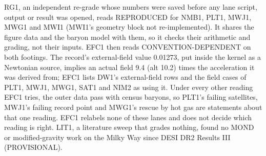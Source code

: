 \documentclass[10pt]{article}
\begin{document}
\begin{itemize}
RG1, an independent re-grade whose numbers were saved before any lane script, output or result was opened, reads REPRODUCED for NMB1, PLT1, MWJ1, MWG1 and MWI1 (MWI1's geometry block not re-implemented). It shares the figure data and the baryon model with them, so it checks their arithmetic and grading, not their inputs. EFC1 then reads CONVENTION-DEPENDENT on both footings. The record's external-field value 0.01273, put inside the kernel as a Newtonian source, implies an actual field 9.4 (alt 10.2) times the acceleration it was derived from; EFC1 lists DW1's external-field rows and the field cases of PLT1, MWJ1, MWG1, SAT1 and NIM2 as using it. Under every other reading EFC1 tries, the outer data pass with census baryons, so PLT1's failing satellites, MWJ1's failing record point and MWG1's rescue by hot gas are statements about that one reading. EFC1 relabels none of these lanes and does not decide which reading is right. LIT1, a literature sweep that grades nothing, found no MOND or modified-gravity work on the Milky Way since DESI DR2 Results III (PROVISIONAL).


\end{itemize}
\end{document}
